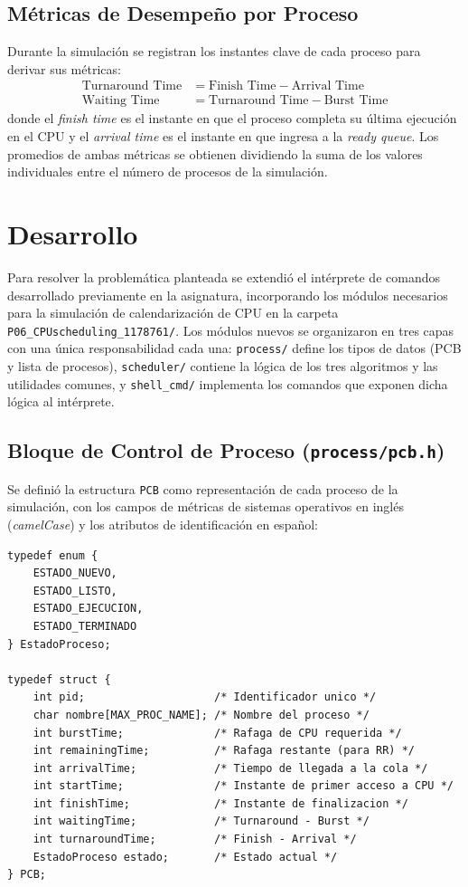 \documentclass[12pt]{article}
\begin{document}
    \subsection{Métricas de Desempeño por Proceso}
    Durante la simulación se registran los instantes clave de cada proceso para derivar sus métricas:
    \begin{align}
        \text{Turnaround Time} &= \text{Finish Time} - \text{Arrival Time} \\
        \text{Waiting Time} &= \text{Turnaround Time} - \text{Burst Time}
    \end{align}
    donde el \textit{finish time} es el instante en que el proceso completa su última ejecución en el CPU y el \textit{arrival time} es el instante en que ingresa a la \textit{ready queue}. Los promedios de ambas métricas se obtienen dividiendo la suma de los valores individuales entre el número de procesos de la simulación.

\newpage
\section{Desarrollo}
    Para resolver la problemática planteada se extendió el intérprete de comandos desarrollado previamente en la asignatura, incorporando los módulos necesarios para la simulación de calendarización de CPU en la carpeta \texttt{P06\_CPUscheduling\_1178761/}. Los módulos nuevos se organizaron en tres capas con una única responsabilidad cada una: \texttt{process/} define los tipos de datos (PCB y lista de procesos), \texttt{scheduler/} contiene la lógica de los tres algoritmos y las utilidades comunes, y \texttt{shell\_cmd/} implementa los comandos que exponen dicha lógica al intérprete.

    \subsection{Bloque de Control de Proceso (\texttt{process/pcb.h})}
    Se definió la estructura \texttt{PCB} como representación de cada proceso de la simulación, con los campos de métricas de sistemas operativos en inglés (\textit{camelCase}) y los atributos de identificación en español:
    \begin{lstlisting}[caption={Estructura del Bloque de Control de Proceso en pcb.h.}]
typedef enum {
    ESTADO_NUEVO,
    ESTADO_LISTO,
    ESTADO_EJECUCION,
    ESTADO_TERMINADO
} EstadoProceso;

typedef struct {
    int pid;                    /* Identificador unico */
    char nombre[MAX_PROC_NAME]; /* Nombre del proceso */
    int burstTime;              /* Rafaga de CPU requerida */
    int remainingTime;          /* Rafaga restante (para RR) */
    int arrivalTime;            /* Tiempo de llegada a la cola */
    int startTime;              /* Instante de primer acceso a CPU */
    int finishTime;             /* Instante de finalizacion */
    int waitingTime;            /* Turnaround - Burst */
    int turnaroundTime;         /* Finish - Arrival */
    EstadoProceso estado;       /* Estado actual */
} PCB;
    \end{lstlisting}
\end{document}

